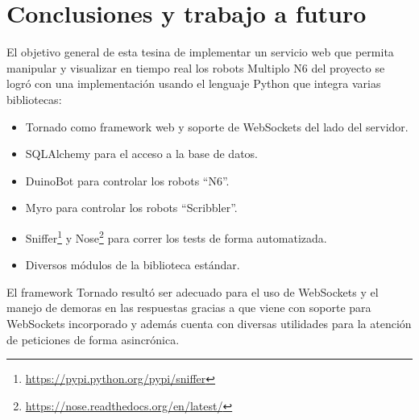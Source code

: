
\chapter{Conclusiones y trabajo a futuro}\label{cha:conclusiones}

%


El objetivo general de esta tesina de implementar un servicio web que permita
manipular y visualizar en tiempo real los robots Multiplo N6 del proyecto
\proyecto{} se logró con una implementación usando el lenguaje Python
que integra varias bibliotecas:

\begin{itemize}
    \item Tornado como framework web y soporte de WebSockets del lado del
    servidor.
    \item SQLAlchemy para el acceso a la base de datos.
    \item DuinoBot para controlar los robots ``N6''.
    \item Myro para controlar los robots ``Scribbler''.
    \item Sniffer\footnote{\url{https://pypi.python.org/pypi/sniffer}} y
    Nose\footnote{\url{https://nose.readthedocs.org/en/latest/}} para correr
    los tests de forma automatizada.
    \item Diversos módulos de la biblioteca estándar.
\end{itemize}

El framework Tornado resultó ser adecuado para el uso de WebSockets y el manejo
de demoras en las respuestas gracias a que viene con soporte para WebSockets
incorporado y además cuenta con diversas utilidades para la atención de peticiones
de forma asincrónica.

